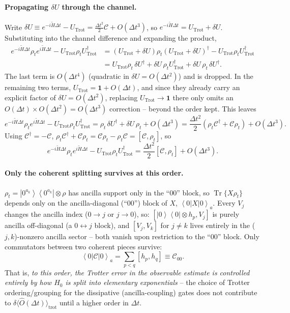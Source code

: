 \documentclass[11pt]{article}
\newcommand{\Dt}{\Delta t}
\newcommand{\calC}{\mathcal{C}}
\newcommand{\rhot}{\rho_t}
\renewcommand{\ket}[1]{\left| #1 \right\rangle}
\renewcommand{\bra}[1]{\left\langle #1 \right|}
\DeclareMathOperator{\Tr}{Tr}
\begin{document}
\paragraph{Propagating $\delta U$ through the channel.} Write $\delta U\equiv e^{-i\tilde{H}\Dt}-U_{\text{Trot}}=\frac{\Dt^2}{2}\calC+O(\Dt^3)$, so $e^{-i\tilde{H}\Dt}=U_{\text{Trot}}+\delta U$. Substituting into the channel difference and expanding the product,
\begin{align}
    e^{-i\tilde{H}\Dt}\rhot e^{i\tilde{H}\Dt}-U_{\text{Trot}}\rhot U_{\text{Trot}}^\dagger
    &= \left(U_{\text{Trot}}+\delta U\right)\rhot\left(U_{\text{Trot}}+\delta U\right)^\dagger - U_{\text{Trot}}\rhot U_{\text{Trot}}^\dagger\\
    &= U_{\text{Trot}}\rhot\,\delta U^\dagger + \delta U\,\rhot U_{\text{Trot}}^\dagger + \delta U\,\rhot\,\delta U^\dagger.
\end{align}
The last term is $O(\Dt^4)$ (quadratic in $\delta U=O(\Dt^2)$) and is dropped. In the remaining two terms, $U_{\text{Trot}}=\mathbf{1}+O(\Dt)$, and since they already carry an explicit factor of $\delta U=O(\Dt^2)$, replacing $U_{\text{Trot}}\to\mathbf{1}$ there only omits an $O(\Dt)\times O(\Dt^2)=O(\Dt^3)$ correction -- beyond the order kept. This leaves
\begin{equation}
    e^{-i\tilde{H}\Dt}\rhot e^{i\tilde{H}\Dt}-U_{\text{Trot}}\rhot U_{\text{Trot}}^\dagger = \rhot\,\delta U^\dagger+\delta U\,\rhot+O(\Dt^3) = \frac{\Dt^2}{2}\left(\rhot\calC^\dagger+\calC\rhot\right)+O(\Dt^3).
\end{equation}
Using $\calC^\dagger=-\calC$, $\rhot\calC^\dagger+\calC\rhot=\calC\rhot-\rhot\calC=[\calC,\rhot]$, so
\begin{equation}
    e^{-i\tilde{H}\Dt}\rhot e^{i\tilde{H}\Dt}-U_{\text{Trot}}\rhot U_{\text{Trot}}^\dagger = \frac{\Dt^2}{2}\left[\calC,\rhot\right]+O(\Dt^3).
\end{equation}

\paragraph{Only the coherent splitting survives at this order.} $\rhot=\ket{0^{a_k}}\bra{0^{a_k}}\otimes\rho$ has ancilla support only in the ``00'' block, so $\Tr\{X\rhot\}$ depends only on the ancilla-diagonal (``00'') block of $X$, $\bra{0}X\ket{0}_a$. Every $V_j$ changes the ancilla index ($0\to j$ or $j\to0$), so: $[\ket{0}\bra{0}\otimes h_p,V_j]$ is purely ancilla off-diagonal (a $0\leftrightarrow j$ block), and $[V_j,V_k]$ for $j\neq k$ lives entirely in the ($j,k$)-nonzero ancilla sector -- both vanish upon restriction to the ``00'' block. Only commutators between two coherent pieces survive:
\begin{equation}\label{eq:C00}
    \bra{0}\calC\ket{0}_a = \sum_{p<q}[h_p,h_q]\equiv\calC_{00}.
\end{equation}
That is, \emph{to this order, the Trotter error in the observable estimate is controlled entirely by how $H_0$ is split into elementary exponentials} -- the choice of Trotter ordering/grouping for the dissipative (ancilla-coupling) gates does not contribute to $\delta\langle\hat{O}(\Dt)\rangle_{\text{trot}}$ until a higher order in $\Dt$.
\end{document}

